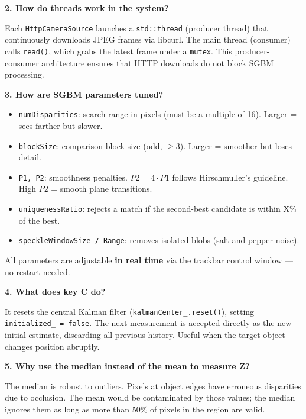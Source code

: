 \documentclass[11pt,a4paper]{article}
\begin{document}
\vspace{6pt}
\textbf{2. How do threads work in the system?}

Each \texttt{HttpCameraSource} launches a \texttt{std::thread} (producer thread) that
continuously downloads JPEG frames via libcurl. The main thread (consumer) calls
\texttt{read()}, which grabs the latest frame under a \texttt{mutex}. This
producer-consumer architecture ensures that HTTP downloads do not block SGBM processing.

\vspace{6pt}
\textbf{3. How are SGBM parameters tuned?}

\begin{itemize}[leftmargin=*,noitemsep]
  \item \texttt{numDisparities}: search range in pixels (must be a multiple of 16). Larger = sees farther but slower.
  \item \texttt{blockSize}: comparison block size (odd, $\geq 3$). Larger = smoother but loses detail.
  \item \texttt{P1, P2}: smoothness penalties. $P2 = 4 \cdot P1$ follows Hirschmuller's guideline. High $P2$ = smooth plane transitions.
  \item \texttt{uniquenessRatio}: rejects a match if the second-best candidate is within X\% of the best.
  \item \texttt{speckleWindowSize / Range}: removes isolated blobs (salt-and-pepper noise).
\end{itemize}

All parameters are adjustable \textbf{in real time} via the trackbar control window --- no restart needed.

\vspace{6pt}
\textbf{4. What does key C do?}

It resets the central Kalman filter (\texttt{kalmanCenter\_.reset()}), setting
\texttt{initialized\_ = false}. The next measurement is accepted directly as the new
initial estimate, discarding all previous history. Useful when the target object
changes position abruptly.

\vspace{6pt}
\textbf{5. Why use the median instead of the mean to measure Z?}

The median is robust to outliers. Pixels at object edges have erroneous disparities
due to occlusion. The mean would be contaminated by those values; the median ignores
them as long as more than 50\% of pixels in the region are valid.
\end{document}

